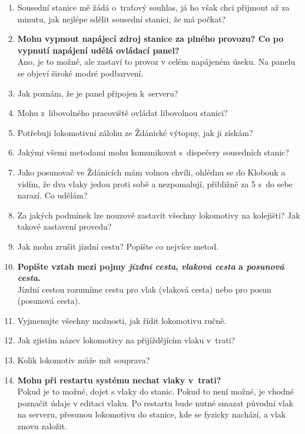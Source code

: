 \documentclass[12pt,a4paper]{article}
\begin{document}
\begin{enumerate}[leftmargin=*]
\item Sousední stanice mě žádá o~traťový souhlas, já ho však chci přijmout až
za minutu, jak nejlépe sdělit sousední stanici, že má počkat?

\item \textbf{Mohu vypnout napájecí zdroj stanice za plného provozu? Co po vypnutí
napájení udělá ovládací panel?}
\\Ano, je to možné, ale zastaví to provoz v celém napájeném úseku. Na panelu se objeví široké modré podbarvení.

\item Jak poznám, že je panel připojen k~serveru?

\item Mohu z~libovolného pracoviště ovládat libovolnou stanici?

\item Potřebuji lokomotivní zálohu ze Ždánické výtopny, jak ji získám?

\item Jakými všemi metodami mohu komunikovat s~dispečery sousedních stanic?

\item Jako posunovač ve Ždánicích mám volnou chvíli, ohlédnu se do Klobouk a
vidím, že dva vlaky jedou proti sobě a nezpomalují, přibližně za 5 s~do sebe
narazí. Co udělám?

\item Za jakých podmínek lze nouzově zastavit všechny lokomotivy na kolejišti?
Jak takové zastavení provedu?

\item Jak mohu zrušit jízdní cestu? Popište co nejvíce metod.

\item \textbf{Popište vztah mezi pojmy \textit{jízdní cesta}, \textit{vlaková cesta} a
\textit{posunová cesta}.}
\\Jízdní cestou rozumíme cestu pro vlak (vlaková cesta) nebo pro posun (posunová cesta).

\item Vyjmenujte všechny možnosti, jak řídit lokomotivu ručně.

\item Jak zjistím název lokomotivy na přijíždějícím vlaku v~trati?

\item Kolik lokomotiv může mít souprava?

\item \textbf{Mohu při restartu systému nechat vlaky v~trati?}
\\Pokud je to možné, dojet s vlaky do stanic. Pokud to není možné, je vhodné poznačit údaje v editaci vlaku. Po restartu bude nutné smazat původní vlak na serveru, přesunou lokomotivu do stanice, kde se fyzicky nachází, a vlak znovu založit.


\end{enumerate}
\end{document}

